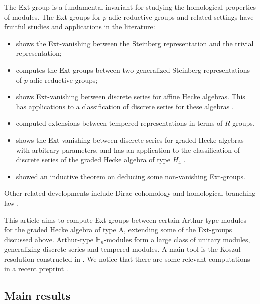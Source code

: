 \documentclass[11pt]{amsart}
\numberwithin{equation}{section}
\theoremstyle{definition}
\begin{document}
The Ext-group is a fundamental invariant for studying the homological properties of modules.
The Ext-groups for $p$-adic reductive groups and related settings have fruitful studies and applications in the literature:
\begin{itemize}
\item \cite{casselmanvanishing} shows the Ext-vanishing between the Steinberg representation and the trivial representation;
\item \cite{orlik2005extensions} computes the Ext-groups between two generalized Steinberg representations of $p$-adic reductive groups;
\item \cite{opdamsolleveldhomo09} shows Ext-vanishing between discrete series for affine Hecke algebras. This has applications to a classification of discrete series for these algebras \cite{opdamsolleveld10}.
\item \cite{opdamsolleveldExttemp} computed extensions between tempered representations in terms of $R$-groups.
\item \cite{chan2016duality} shows the Ext-vanishing between discrete series for graded Hecke algebras with arbitrary parameters, and has an application to the classification of discrete series of the graded Hecke algebra of type $H_4$ \cite{chanhuang}.
\item \cite{chanqarciinductiveExt} showed an inductive theorem on deducing some non-vanishing Ext-groups.
\end{itemize}
Other related developments include Dirac cohomology \cite{barbaschciubotrapa} and homological branching law \cite{PrasadExt}. 




This article aims to compute Ext-groups between certain Arthur type modules for the graded Hecke algebra of type A, extending some of the Ext-groups discussed above. Arthur-type \(\mathbb H_n\)-modules form a large class of unitary modules, generalizing discrete series and tempered modules. A main tool is the Koszul resolution constructed in \cite{chan2016duality}. We notice that there are some relevant computations in a recent preprint \cite{chen2026extension}.





 

\subsection{Main results}
\end{document}

